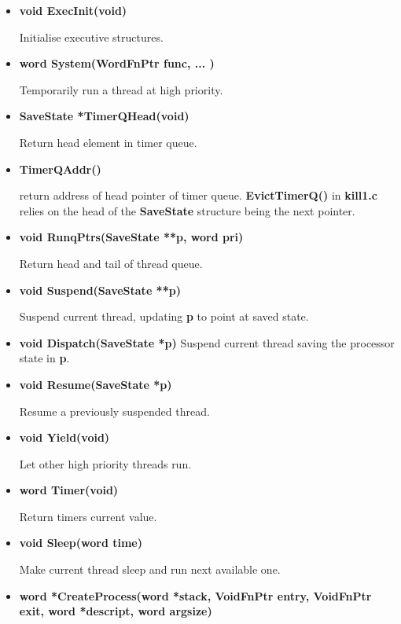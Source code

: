 \begin{itemize}
\item {\bf void ExecInit(void)}                    

Initialise executive structures.

\item {\bf word System(WordFnPtr func, ... )}      

Temporarily run a thread at high priority.

\item {\bf SaveState *TimerQHead(void)}

Return head element in timer queue.

\item {\bf TimerQAddr()}

return address of head pointer of timer queue.
{\bf EvictTimerQ()} in {\bf kill1.c} relies on the head of the
{\bf SaveState} structure being the next pointer.

\item {\bf void RunqPtrs(SaveState **p, word pri)} 

Return head and tail of thread queue.

\item {\bf void Suspend(SaveState **p)}

Suspend current thread, updating {\bf p} to point at saved state.

\item {\bf void Dispatch(SaveState *p)}
Suspend current thread saving the processor state in {\bf p}.

\item {\bf void Resume(SaveState *p)}  

Resume a previously suspended thread.

\item {\bf void Yield(void)}

Let other high priority threads run.

\item {\bf word Timer(void)}  

Return timers current value.

\item {\bf void Sleep(word time)}  

Make current thread sleep and run next available one.

\item {\bf word *CreateProcess(word *stack, VoidFnPtr entry, VoidFnPtr \newline
exit, word *descript, word argsize)} 


\end{itemize}
